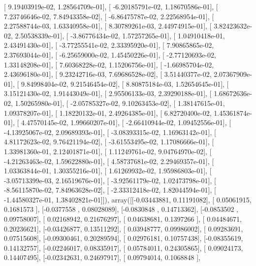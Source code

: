 \documentclass{article}
\begin{document}
       [  9.19403919e-02,   1.28564709e-01],
       [ -6.20185791e-02,   1.18670586e-01],
       [  7.23746646e-02,   7.84943358e-02],
       [ -6.86475787e-02,   2.22568954e-01],
       [  2.27588744e-03,   1.63340958e-01],
       [  8.30789261e-03,   2.44974915e-01],
       [  3.82423632e-02,   2.50538339e-01],
       [ -3.86776434e-02,   1.57257265e-01],
       [  1.04910418e-01,   2.43491430e-01],
       [ -3.77255541e-02,   2.33395920e-01],
       [  7.90865865e-02,   2.37693044e-01],
       [ -6.25659000e-02,   1.45450226e-01],
       [ -2.77120693e-02,   1.33148208e-01],
       [  7.60368228e-02,   1.15206756e-01],
       [ -1.66985704e-02,   2.43696180e-01],
       [  9.23242716e-03,   7.69686528e-02],
       [  3.51440377e-02,   2.07367909e-01],
       [  9.84998404e-02,   9.21546454e-02],
       [  8.80875184e-03,   1.52654645e-01],
       [  3.15121430e-02,   1.91443049e-01],
       [  2.95506133e-03,   2.39290188e-01],
       [  1.68672636e-02,   1.50265980e-01],
       [ -2.05785327e-02,   9.10263453e-02],
       [  1.38147615e-01,   1.09378207e-01],
       [  1.18220132e-01,   2.49264385e-01],
       [  6.82720400e-02,   1.45361874e-01],
       [  4.47570145e-02,   1.99660207e-01],
       [ -2.66410944e-02,   1.09452556e-01],
       [ -4.13925067e-02,   2.09689393e-01],
       [ -3.08393315e-02,   1.16963142e-01],
       [  4.81172623e-02,   9.76421194e-02],
       [ -3.61553495e-02,   1.17086666e-01],
       [  1.33981360e-01,   2.12401871e-01],
       [  1.11249761e-02,   9.04764970e-02],
       [ -4.21263463e-02,   1.59622880e-01],
       [  4.58737681e-02,   2.29469357e-01],
       [  1.03363844e-01,   1.30355216e-01],
       [  1.61269932e-02,   1.95986803e-01],
       [ -3.05713399e-03,   2.16519676e-01],
       [ -3.92561179e-02,   1.02473798e-01],
       [ -8.56115870e-02,   7.84963628e-02],
       [ -2.33312418e-02,   1.82044594e-01],
       [ -1.44580327e-01,   1.38402821e-01]]), array([[-0.03443881,  0.11191082],
       [ 0.05061915,  0.1681573 ],
       [-0.0377558 ,  0.08028089],
       [-0.0830848 ,  0.14713362],
       [-0.0853502 ,  0.09758007],
       [ 0.02168942,  0.21676297],
       [ 0.04638681,  0.1397266 ],
       [ 0.04484671,  0.20236621],
       [-0.03426877,  0.13511292],
       [ 0.03948777,  0.09986002],
       [ 0.09283691,  0.07515608],
       [-0.09300461,  0.20289594],
       [ 0.02976181,  0.10757438],
       [-0.08355619,  0.14132757],
       [-0.02246017,  0.08335917],
       [ 0.05784011,  0.24305865],
       [ 0.09024173,  0.14407495],
       [-0.02342631,  0.24697917],
       [ 0.09794014,  0.1068848 ],
\end{document}
